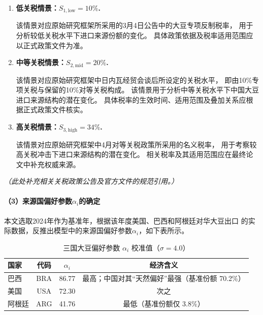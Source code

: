 \documentclass{apmcmthesis}
\begin{document}
\begin{enumerate}[label=\arabic*., leftmargin=2.5em]

    \item \textbf{低关税情景：$S_{1,\mathrm{low}}=10\%$.}

    该情景对应原始研究框架所采用的3月4日公告中的大豆专项反制税率，
    用于分析较低关税水平下进口来源份额的变化。
    具体政策依据及税率适用范围应以正式政策文件为准。

    \item \textbf{中等关税情景：$S_{2,\mathrm{mid}}=20\%$.}

    该情景对应原始研究框架中日内瓦经贸会谈后所设定的关税水平，
    即由10\%专项关税与保留的10\%对等关税构成。
    该情景用于分析中等关税水平下中国大豆进口来源结构的潜在变化。
    具体税率的生效时间、适用范围及叠加关系应根据正式政策文件核实。

    \item \textbf{高关税情景：$S_{3,\mathrm{high}}=34\%$.}

    该情景对应原始研究框架中4月对等关税政策所采用的名义税率，
    用于考察较高关税冲击下进口来源结构的潜在变化。
    相关税率及其适用范围应在最终论文中补充权威来源。

\end{enumerate}

\textit{（此处补充相关关税政策公告及官方文件的规范引用。）}

\paragraph{（3）来源国偏好参数$\alpha_i$的确定}

本文选取2024年作为基准年，根据该年度美国、巴西和阿根廷对华大豆出口
的实际数据，反推出模型中的来源国偏好参数$\alpha_i$，如下表所示。

\begin{table}[H]
  \centering
  \caption{三国大豆偏好参数 $\alpha_i$ 校准值（$\sigma=4.0$）}
  \label{tab:alpha}
  \begin{tabular}{lccc}
    \toprule
    国家 & 代码 & $\alpha_i$ & 经济含义 \\
    \midrule
    巴西 & BRA & 86.77 & 最高；中国对其``天然偏好''最强（基准份额 70.2\%） \\
    美国 & USA & 72.30 & 次之 \\
    阿根廷 & ARG & 41.76 & 最低（基准份额仅 3.8\%） \\
    \bottomrule
  \end{tabular}
\end{table}
\end{document}
